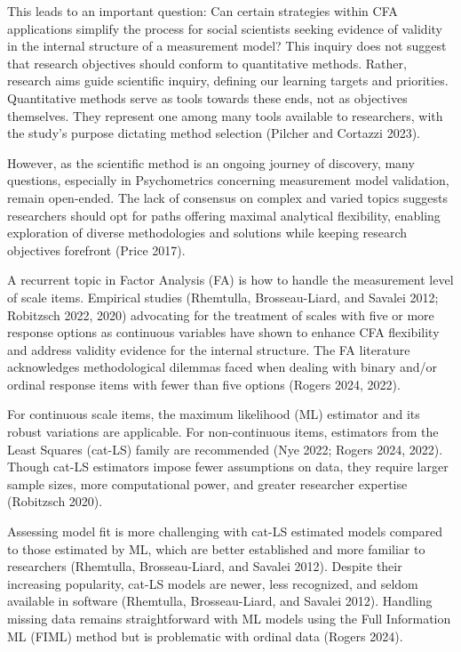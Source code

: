 \documentclass[
  a4paper,
]{article}
\begin{document}
This leads to an important question: Can certain strategies within CFA
applications simplify the process for social scientists seeking evidence
of validity in the internal structure of a measurement model? This
inquiry does not suggest that research objectives should conform to
quantitative methods. Rather, research aims guide scientific inquiry,
defining our learning targets and priorities. Quantitative methods serve
as tools towards these ends, not as objectives themselves. They
represent one among many tools available to researchers, with the
study's purpose dictating method selection (Pilcher and Cortazzi 2023).

However, as the scientific method is an ongoing journey of discovery,
many questions, especially in Psychometrics concerning measurement model
validation, remain open-ended. The lack of consensus on complex and
varied topics suggests researchers should opt for paths offering maximal
analytical flexibility, enabling exploration of diverse methodologies
and solutions while keeping research objectives forefront (Price 2017).

A recurrent topic in Factor Analysis (FA) is how to handle the
measurement level of scale items. Empirical studies (Rhemtulla,
Brosseau-Liard, and Savalei 2012; Robitzsch 2022, 2020) advocating for
the treatment of scales with five or more response options as continuous
variables have shown to enhance CFA flexibility and address validity
evidence for the internal structure. The FA literature acknowledges
methodological dilemmas faced when dealing with binary and/or ordinal
response items with fewer than five options (Rogers 2024, 2022).

For continuous scale items, the maximum likelihood (ML) estimator and
its robust variations are applicable. For non-continuous items,
estimators from the Least Squares (cat-LS) family are recommended (Nye
2022; Rogers 2024, 2022). Though cat-LS estimators impose fewer
assumptions on data, they require larger sample sizes, more
computational power, and greater researcher expertise (Robitzsch 2020).

Assessing model fit is more challenging with cat-LS estimated models
compared to those estimated by ML, which are better established and more
familiar to researchers (Rhemtulla, Brosseau-Liard, and Savalei 2012).
Despite their increasing popularity, cat-LS models are newer, less
recognized, and seldom available in software (Rhemtulla, Brosseau-Liard,
and Savalei 2012). Handling missing data remains straightforward with ML
models using the Full Information ML (FIML) method but is problematic
with ordinal data (Rogers 2024).
\end{document}
